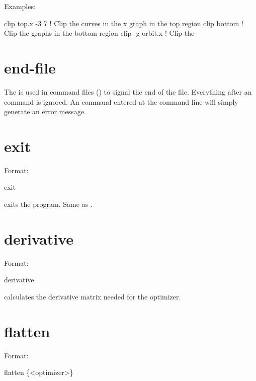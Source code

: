 {{{Examples:
\begin{example}
  clip top.x -3  7  ! Clip the curves in the x graph in the top region
  clip bottom       ! Clip the graphs in the bottom region
  clip -g orbit.x   ! Clip the 
\end{example}

\section{end-file}
\label{s:end.file}

The  is used in command files () to signal
the end of the file. Everything after an  command is
ignored. An  command entered at the command line will
simply generate an error message.

\section{exit}
\label{s:exit}

Format:
\begin{example}
  exit
\end{example}

\vskip 0.2in
 exits the program. Same as .

\section{derivative}
\label{s:deriv}

Format:
\begin{example}
  derivative
\end{example}

\vskip 0.2in 
 calculates the  derivative
matrix needed for the  optimizer.

\section{flatten}
\label{s:flatten}

Format:
\begin{example}
  flatten \{<optimizer>\}
\end{example}

}}}

